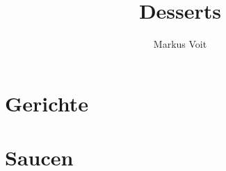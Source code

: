 \documentclass[
  DIV=11,%
  pagesize,%
  fontsize=11pt,%
  paper=a4,%
  numbers=noenddot,
]{scrartcl}
\title{Desserts}
\author{Markus Voit}
\begin{document}
\maketitle

\tableofcontents
\clearpage

\section{Gerichte}
\newpage{}
\newpage{}
\newpage{}
\newpage{}

\section{Saucen}
\newpage{}
\newpage{}
\newpage{}
\end{document}
